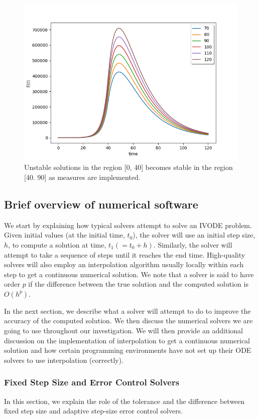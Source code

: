 \begin{figure}[H]
\centering
\includegraphics[width=0.7\linewidth]{./figures/regain_stability_after_measures}
\caption{Unstable solutions in the region [0, 40] becomes stable in the region [40. 90] as measures are implemented.}
\label{fig:regain_stability_after_measures}
\end{figure}

\subsection{Brief overview of numerical software}
We start by explaining how typical solvers attempt to solve an IVODE problem. Given initial values (at the initial time, $t_0$), the solver will use an initial step size, $h$, to compute a solution at time, $t_1 (= t_0 + h)$. Similarly, the solver will attempt to take a sequence of steps until it reaches the end time. High-quality solvers will also employ an interpolation algorithm usually locally within each step to get a continuous numerical solution. We note that a solver is said to have order $p$ if the difference between the true solution and the computed solution is $O(h^p)$.

In the next section, we describe what a solver will attempt to do to improve the accuracy of the computed solution. We then discuss the numerical solvers we are going to use throughout our investigation. We will then provide an additional discussion on the implementation of interpolation to get a continuous numerical solution and how certain programming environments have not set up their ODE solvers to use interpolation (correctly).

\subsubsection{Fixed Step Size and Error Control Solvers}
\label{subsection:fixed_vs_control}
In this section, we explain the role of the tolerance and the difference between fixed step size and adaptive step-size error control solvers.

